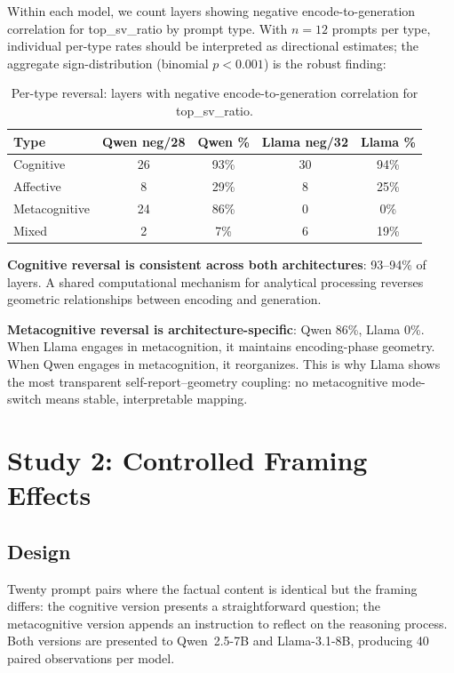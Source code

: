 \documentclass[11pt,a4paper]{article}
\begin{document}
Within each model, we count layers showing negative encode-to-generation
correlation for top\_sv\_ratio by prompt type. With $n = 12$ prompts per
type, individual per-type rates should be interpreted as directional
estimates; the aggregate sign-distribution (binomial $p < 0.001$) is the
robust finding:

\begin{table}[H]
\centering
\caption{Per-type reversal: layers with negative encode-to-generation correlation for top\_sv\_ratio.}
\label{tab:reversal_per_type}
\begin{tabular}{lcccc}
\toprule
\textbf{Type} & \textbf{Qwen neg/28} & \textbf{Qwen \%} & \textbf{Llama neg/32} & \textbf{Llama \%} \\
\midrule
Cognitive      & 26 & 93\% & 30 & 94\% \\
Affective      & 8  & 29\% & 8  & 25\% \\
Metacognitive  & 24 & 86\% & 0  & 0\%  \\
Mixed          & 2  & 7\%  & 6  & 19\% \\
\bottomrule
\end{tabular}
\end{table}

\textbf{Cognitive reversal is consistent across both architectures}: 93--94\% of layers. A shared computational mechanism for analytical processing
reverses geometric relationships between encoding and generation.

\textbf{Metacognitive reversal is architecture-specific}: Qwen 86\%, Llama
0\%. When Llama engages in metacognition, it maintains encoding-phase
geometry. When Qwen engages in metacognition, it reorganizes. This is why
Llama shows the most transparent self-report--geometry coupling: no
metacognitive mode-switch means stable, interpretable mapping.

\section{Study 2: Controlled Framing Effects}

\subsection{Design}

Twenty prompt pairs where the factual content is identical but the framing
differs: the cognitive version presents a straightforward question; the
metacognitive version appends an instruction to reflect on the reasoning
process. Both versions are presented to Qwen~2.5-7B and Llama-3.1-8B,
producing 40 paired observations per model.
\end{document}
